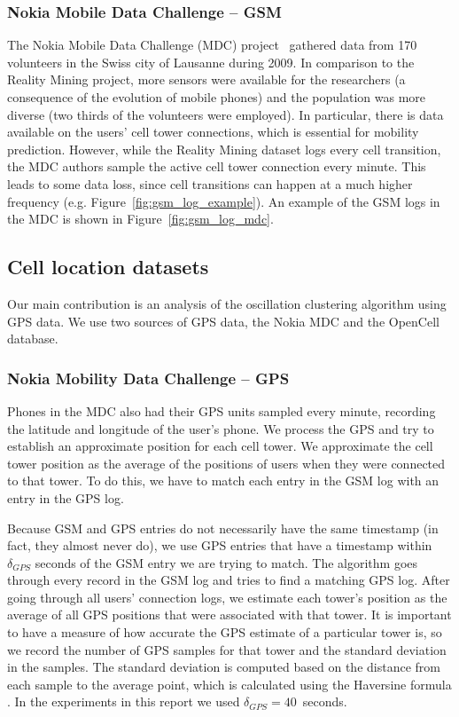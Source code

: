 \documentclass[letterpaper, 12pt, conference]{ieeeconf}
\begin{document}
\subsubsection{Nokia Mobile Data Challenge -- GSM}

The Nokia Mobile Data Challenge (MDC) project~\cite{nokiaMdc} gathered data 
from 170 volunteers in the Swiss city of Lausanne during 2009. In comparison 
to the Reality Mining project, more sensors were available for the 
researchers (a consequence of the evolution of mobile phones) and the 
population was more diverse (two thirds of the volunteers were employed). In 
particular, there is data available on the users' cell tower connections, 
which is essential for mobility prediction. However, while the Reality Mining 
dataset logs every cell transition, the MDC authors sample the active cell 
tower connection every minute. This leads to some data loss, since cell 
transitions can happen at a much higher frequency (e.g.
Figure~\ref{fig:gsm_log_example}). An example of the GSM logs in the MDC is shown in
Figure~\ref{fig:gsm_log_mdc}.

\subsection{Cell location datasets}

Our main contribution is an analysis of the oscillation clustering algorithm 
using GPS data. We use two sources of GPS data, the Nokia MDC and the 
OpenCell database.

\subsubsection{Nokia Mobility Data Challenge -- GPS}

Phones in the MDC also had their GPS units sampled every minute, recording 
the latitude and longitude of the user's phone. We process the GPS and try to 
establish an approximate position for each cell tower. We approximate the 
cell tower position as the average of the positions of users when they were 
connected to that tower. To do this, we have to match each entry in the GSM 
log with an entry in the GPS log.

Because GSM and GPS entries do not necessarily have the same timestamp (in 
fact, they almost never do), we use GPS entries that have a timestamp within $
\delta_{GPS}$ seconds of the GSM entry we are trying to match. The algorithm 
goes through every record in the GSM log and tries to find a matching GPS 
log. After going through all users' connection logs, we estimate each tower's 
position as the average of all GPS positions that were associated with that 
tower. It is important to have a measure of how accurate the GPS estimate of 
a particular tower is, so we record the number of GPS samples for that tower 
and the standard deviation in the samples. The standard deviation is computed 
based on the distance from each sample to the average point, which is 
calculated using the Haversine formula \cite{haversine}. In the experiments in this
report we used $\delta_{GPS}=40$~seconds.
\end{document}
